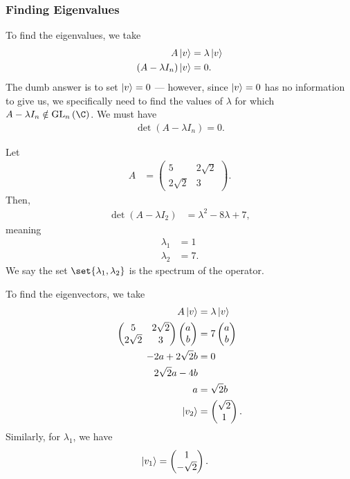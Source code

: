 \documentclass[10pt]{mypackage}
\begin{document}
\subsubsection{Finding Eigenvalues}%
To find the eigenvalues, we take
\begin{align*}
  A\ket{v} &= \lambda \ket{v}\\
  \left(A - \lambda I_{n}\right)\ket{v} &= 0.
\end{align*}
The dumb answer is to set $\ket{v} = 0$ --- however, since $\ket{v} = 0$ has no information to give us, we specifically need to find the values of $\lambda$ for which $A - \lambda I_{n}\notin \text{GL}_{n}\left(\C\right)$. We must have
\begin{align*}
  \det\left(A - \lambda I_{n}\right) = 0.
\end{align*}
\begin{example}
  \renewcommand{\arraystretch}{1.5}
  Let
  \begin{align*}
    A &= \begin{pmatrix}5 & 2\sqrt{2} \\ 2\sqrt{2} & 3\end{pmatrix}.
  \end{align*}
  Then,
  \begin{align*}
    \det\left(A - \lambda I_{2}\right) &= \lambda^2 - 8\lambda + 7,
  \end{align*}
  meaning
  \begin{align*}
    \lambda_1 &= 1\\
    \lambda_2 &= 7.
  \end{align*}
  We say the set $\set{\lambda_1,\lambda_2}$ is the spectrum of the operator.\newline

  To find the eigenvectors, we take
  \begin{align*}
    A \ket{v} &= \lambda \ket{v}\\
    \begin{pmatrix}5 & 2\sqrt{2} \\ 2\sqrt{2} & 3\end{pmatrix} \begin{pmatrix}a\\b\end{pmatrix} &= 7 \begin{pmatrix}a\\b\end{pmatrix}\\
    -2a + 2\sqrt{2}b &= 0\\
    2\sqrt{2}a - 4b\\
    a &= \sqrt{2} b\\
    \ket{v_2} &= \begin{pmatrix}\sqrt{2}\\1\end{pmatrix}.
  \end{align*}
  Similarly, for $\lambda_1$, we have
  \begin{align*}
    \ket{v_1} &= \begin{pmatrix}1\\-\sqrt{2}\end{pmatrix}.
  \end{align*}

\end{example}
\end{document}
